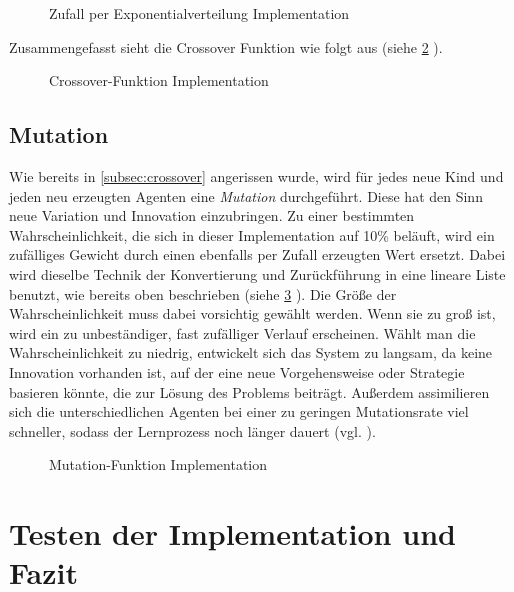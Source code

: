 \documentclass[parskip=half,titlepage]{scrartcl}
\begin{document}
\begin{figure}[h]
 
 \caption{Zufall per Exponentialverteilung Implementation}
 \label{fig:get_skewed_random}
\end{figure}


Zusammengefasst sieht die Crossover Funktion wie folgt aus (siehe \cref{fig:crossover} ).

\begin{figure}[h]
 
 \caption{Crossover-Funktion Implementation}
 \label{fig:crossover}
\end{figure}



\subsection{Mutation}
\label{subsec:mutation}
Wie bereits in \cref{subsec:crossover} angerissen wurde, wird für jedes neue Kind und jeden neu erzeugten Agenten eine \textit{Mutation} durchgeführt. Diese hat den Sinn neue Variation und Innovation einzubringen. Zu einer bestimmten Wahrscheinlichkeit, die sich in dieser Implementation auf 10\% beläuft, wird ein zufälliges Gewicht durch einen ebenfalls per Zufall erzeugten Wert ersetzt. Dabei wird dieselbe Technik der Konvertierung und Zurückführung in eine lineare Liste benutzt, wie bereits oben beschrieben (siehe \cref{fig:mutation} ). Die Größe der Wahrscheinlichkeit muss dabei vorsichtig gewählt werden. Wenn sie zu groß ist, wird ein zu unbeständiger, fast zufälliger Verlauf erscheinen. Wählt man die Wahrscheinlichkeit zu niedrig, entwickelt sich das System zu langsam, da keine Innovation vorhanden ist, auf der eine neue Vorgehensweise oder Strategie basieren könnte, die zur Lösung des Problems beiträgt. Außerdem assimilieren sich die unterschiedlichen Agenten bei einer zu geringen Mutationsrate viel schneller, sodass der Lernprozess noch länger dauert (vgl. \cite[31 - 32]{eiben_smith_2016} ).

\begin{figure}[h]
 
 \caption{Mutation-Funktion Implementation}
 \label{fig:mutation}
\end{figure}



\section{Testen der Implementation und Fazit}
\end{document}
